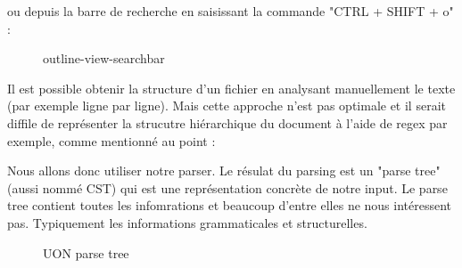 \documentclass[
    iict, %
    il, %
]{heig-tb}
\begin{document}
ou depuis la barre de recherche en saisissant la commande "CTRL + SHIFT + o" :

\begin{figure}[!h]
    \begin{center}
    \end{center}
    \caption[outline-view-searchbar]{\label{outline-view-searchbar} outline-view-searchbar}
\end{figure}

Il est possible obtenir la structure d'un fichier en analysant manuellement le texte (par exemple ligne par ligne).
Mais cette approche n'est pas optimale et il serait diffile de représenter la strucutre hiérarchique du document à l'aide de regex par exemple,
comme mentionné au point : %

Nous allons donc utiliser notre parser.
Le résulat du parsing est un "parse tree" (aussi nommé CST) qui est une représentation concrète de notre input. Le parse tree contient toutes les infomrations et beaucoup d'entre elles ne nous intéressent pas.
Typiquement les informations grammaticales et structurelles.

\begin{figure}[!h]
    \begin{center}
    \end{center}
    \caption[UON parse tree]{\label{parse-tree} UON parse tree}
\end{figure}
\end{document}
